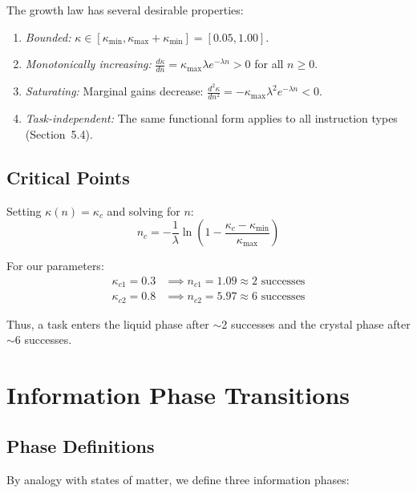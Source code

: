 \documentclass[10pt,twocolumn]{article}
\newcommand{\kap}{\kappa}
\begin{document}
The growth law has several desirable properties:
\begin{enumerate}[leftmargin=*, itemsep=2pt]
  \item \textit{Bounded:} $\kap \in [\kap_{\min}, 
    \kap_{\max} + \kap_{\min}] = [0.05, 1.00]$.
  \item \textit{Monotonically increasing:} 
    $\frac{d\kappa}{dn} = \kappa_{\max}\lambda 
    e^{-\lambda n} > 0$ for all $n \geq 0$.
  \item \textit{Saturating:} Marginal gains decrease: 
    $\frac{d^2\kappa}{dn^2} = -\kappa_{\max}\lambda^2 
    e^{-\lambda n} < 0$.
  \item \textit{Task-independent:} The same functional form 
    applies to all instruction types (Section~5.4).
\end{enumerate}

\subsection{Critical Points}

Setting $\kap(n) = \kap_c$ and solving for $n$:
\begin{equation}
  n_c = -\frac{1}{\lambda} \ln\!\left(
    1 - \frac{\kap_c - \kap_{\min}}{\kap_{\max}}
  \right)
  \label{eq:nc}
\end{equation}

For our parameters:
\begin{align}
  \kap_{c1} = 0.3 &\implies n_{c1} = 1.09 
    \approx 2 \text{ successes} \\
  \kap_{c2} = 0.8 &\implies n_{c2} = 5.97 
    \approx 6 \text{ successes}
\end{align}

Thus, a task enters the liquid phase after $\sim$2 successes 
and the crystal phase after $\sim$6 successes.

\section{Information Phase Transitions}

\subsection{Phase Definitions}

By analogy with states of matter, we define three information 
phases:
\end{document}
